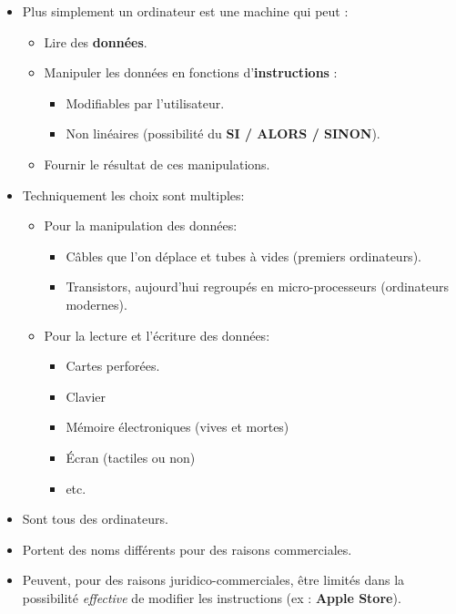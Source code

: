 \begin{slide}
	\begin{itemize}
		\item Plus simplement un ordinateur est une machine qui peut :
			\begin{itemize}
				\item Lire des \textbf{données}. 
				\item Manipuler les données en fonctions d'\textbf{instructions} :
					\begin{itemize}
						\item Modifiables par l'utilisateur.
						\item Non linéaires (possibilité du \textbf{SI / ALORS / SINON}). %
					\end{itemize}
				\item Fournir le résultat de ces manipulations. 
			\end{itemize}
		\item Techniquement les choix sont multiples:
			\begin{itemize}
				\item Pour la manipulation des données:
					\begin{itemize}
						\item Câbles que l'on déplace et tubes à vides (premiers ordinateurs).
						\item Transistors, aujourd'hui regroupés en micro-processeurs (ordinateurs modernes).
					\end{itemize}
				\item Pour la lecture et l'écriture des données:
					\begin{itemize}
						\item Cartes perforées.
						\item Clavier
						\item Mémoire électroniques (vives et mortes)
						\item Écran (tactiles ou non)
						\item etc.
					\end{itemize}
			\end{itemize}
	\end{itemize}
\end{slide}
\begin{slide}
			\begin{itemize}
				\item Sont tous des ordinateurs.
				\item Portent des noms différents pour des raisons commerciales.
				\item Peuvent, pour des raisons juridico-commerciales, être limités dans la possibilité \emph{effective} de modifier les instructions (ex : \textbf{Apple Store}).
			\end{itemize}

\end{slide}
